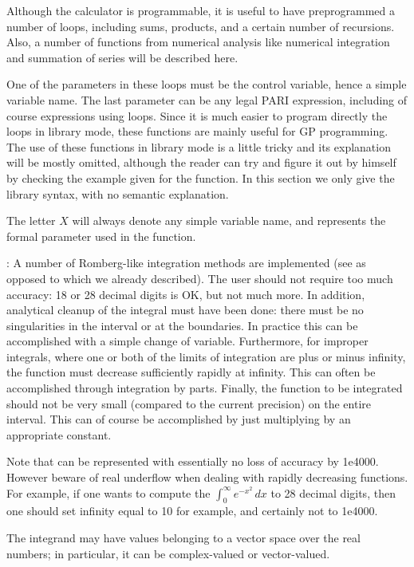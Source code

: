 Although the  calculator is programmable, it is useful to have
preprogrammed a number of loops, including sums, products, and a certain
number of recursions. Also, a number of functions from numerical analysis
like numerical integration and summation of series will be described here.

One of the parameters in these loops must be the control variable, hence a
simple variable name. The last parameter can be any legal PARI expression,
including of course expressions using loops. Since it is much easier to
program directly the loops in library mode, these functions are mainly
useful for GP programming. The use of these functions in library mode is a
little tricky and its explanation will be mostly omitted, although the
reader can try and figure it out by himself by checking the example given
for the  function. In this section we only give the library
syntax, with no semantic explanation.

The letter $X$ will always denote any simple variable name, and represents
the formal parameter used in the function.

: A number
of Romberg-like integration methods are implemented (see  as
opposed to  which we already described). The user should not
require too much accuracy: 18 or 28 decimal digits is OK, but not much more.
In addition, analytical cleanup of the integral must have been done: there
must be no singularities in the interval or at the boundaries. In practice
this can be accomplished with a simple change of variable. Furthermore, for
improper integrals, where one or both of the limits of integration are plus
or minus infinity, the function must decrease sufficiently rapidly at
infinity. This can often be accomplished through integration by parts.
Finally, the function to be integrated should not be very small
(compared to the current precision) on the entire interval. This can
of course be accomplished by just multiplying by an appropriate
constant.

Note that  can be represented with essentially no loss of
accuracy by 1e4000. However beware of real underflow when dealing with
rapidly decreasing functions. For example, if one wants to compute the
$\int_0^\infty e^{-x^2}\,dx$ to 28 decimal digits, then one should set
infinity equal to 10 for example, and certainly not to 1e4000.

The integrand may have values belonging to a vector space over the real
numbers; in particular, it can be complex-valued or vector-valued.

